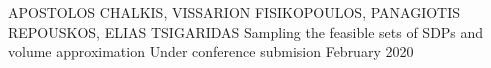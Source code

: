 

\begin{cventries}

  \cventry
    {APOSTOLOS CHALKIS, VISSARION FISIKOPOULOS, PANAGIOTIS REPOUSKOS, ELIAS TSIGARIDAS} %
    {Sampling the feasible sets of SDPs and volume approximation} %
    {Under conference submision} %
    {February 2020} %
    {}


\end{cventries}
